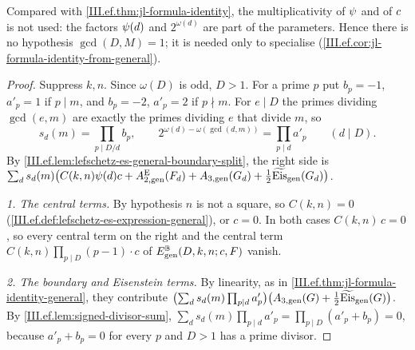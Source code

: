 \noindent Compared with \cref{III.ef.thm:jl-formula-identity}, the multiplicativity of $\psi$ and of $c$ is not used: the factors
$\psi(d)$ and $2^{\omega(d)}$ are part of the parameters. Hence there is no hypothesis $\gcd(D,M)=1$; it is needed only to specialise
(\cref{III.ef.cor:jl-formula-identity-from-general}).

\begin{theorem}
\end{theorem}
\begin{proof}
Suppress $k,n$. Since $\omega(D)$ is odd, $D>1$. For a prime $p$ put $b_p=-1$, $a'_p=1$ if $p\mid m$, and $b_p=-2$, $a'_p=2$ if $p\nmid m$. For
$e\mid D$ the primes dividing $\gcd(e,m)$ are exactly the primes dividing $e$ that divide $m$, so
\[
  s_d(m)=\prod_{p\mid D/d}b_p,\qquad 2^{\omega(d)-\omega(\gcd(d,m))}=\prod_{p\mid d}a'_p\qquad(d\mid D).
\]
By \cref{III.ef.lem:lefschetz-es-general-boundary-split}, the right side is
$\sum_ds_d(m)\bigl(C(k,n)\psi(d)c+A_{2,\mathrm{gen}}^{\mathrm E}(F_d)+A_{3,\mathrm{gen}}(G_d)+\frac12\widetilde{\mathrm{Eis}}_{\mathrm{gen}}(G_d)\bigr)$.

\emph{1. The central terms.} By hypothesis $n$ is not a square, so $C(k,n)=0$ (\cref{III.ef.def:lefschetz-es-expression-general}), or $c=0$. In both cases
$C(k,n)\,c=0$, so every central term on the right and the central term $C(k,n)\prod_{p\mid D}(p-1)\cdot c$ of $E^{\mathbb{B}}_{\mathrm{gen}}(D,k,n;c,F)$ vanish.

\emph{2. The boundary and Eisenstein terms.} By linearity, as in \cref{III.ef.thm:jl-formula-identity-general}, they contribute
$\bigl(\sum_ds_d(m)\prod_{p\mid d}a'_p\bigr)\bigl(A_{3,\mathrm{gen}}(G)+\frac12\widetilde{\mathrm{Eis}}_{\mathrm{gen}}(G)\bigr)$. By \cref{III.ef.lem:signed-divisor-sum},
$\sum_ds_d(m)\prod_{p\mid d}a'_p=\prod_{p\mid D}(a'_p+b_p)=0$, because $a'_p+b_p=0$ for every $p$ and $D>1$ has a prime divisor.


\end{proof}

